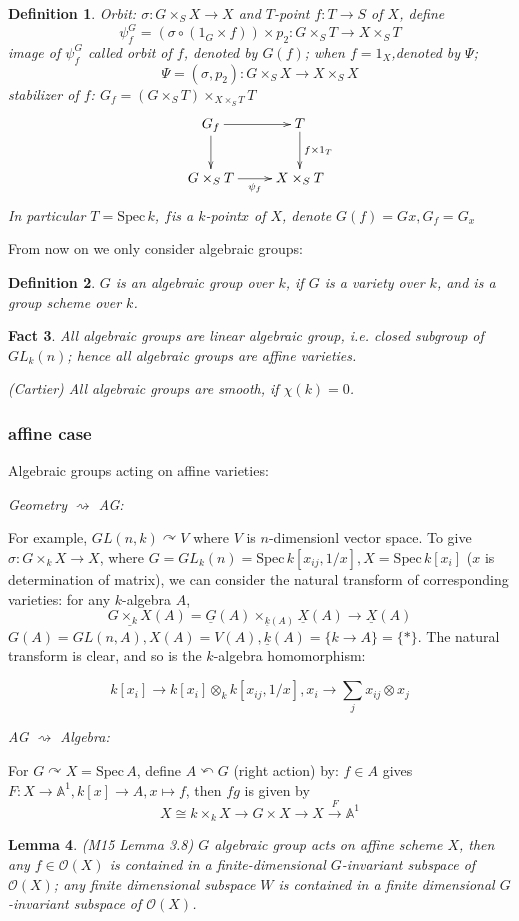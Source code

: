 \documentclass{article}
\newtheorem{defn}{Definition}[section]
\newtheorem{lem}[defn]{Lemma}
\newtheorem{fact}[defn]{Fact}
\newcommand{\Spec}{\mathrm{Spec}\,}
\begin{document}
\begin{defn}
	Orbit: $ \sigma :G\times_S X\to X $ and  $ T $-point $ f:T\to S $ of $ X $, define $$ \psi_f^G=(\sigma\circ (1_G\times f))\times p_2:G\times _S T\to X\times_ST  $$
	image of $ \psi_f^G $ called orbit of $ f $, denoted by $ G(f) $; when $ f=1_X $,denoted by $ \Psi $;
	$$ \Psi=(\sigma,p_2):G\times_SX\to X\times_SX $$	
	stabilizer of $ f $: $ G_f=(G\times_S T)\times_{X\times_S T} T $
	$$\xymatrix{
		G_f \ar[d] \ar[r] & T \ar[d]^-{f\times 1_T} \\
		G\times_S T \ar[r]_-{\psi _f} & X\times_S T
	}$$
	In particular $ T=\mathrm{Spec}\,k $, $ f $is a $ k $-point$ x $ of $ X $, denote $ G(f)=Gx,G_f=G_x $
\end{defn}

From now on we only consider algebraic groups:
\begin{defn}
	$ G $ is an algebraic group over $ k $, if $ G $ is a variety over $ k $, and is a group scheme over $ k $.
\end{defn}

\begin{fact}
	All algebraic groups are linear algebraic group, i.e. closed subgroup of $ GL_k(n) $; hence all algebraic groups are affine varieties.
	
	(Cartier) All algebraic groups are smooth, if $ \chi(k)=0 $.
\end{fact}
\subsubsection{affine case}
Algebraic groups acting on affine varieties:

\emph{Geometry $ \rightsquigarrow $ AG:}

For example, $ GL(n,k)\curvearrowright V $ where $ V $ is $ n $-dimensionl vector space. To give $ \sigma:G\times_kX\to X $, where $ G=GL_k(n)=\Spec k[x_{ij},1/x], X=\Spec k[x_i] $ ($ x $ is determination of matrix), we can consider the natural transform of corresponding varieties: for any $ k $-algebra $ A $,
$$ \underline{G\times_kX}(A)=\underline{G}(A)\times_{\underline{k}(A)}\underline{X}(A)\to \underline{X}(A) $$
  $ G(A)=GL(n,A),X(A)=V(A),\underline{k}(A)=\{k\to A \}=\{* \} $. The  natural transform is clear, and so is the $ k $-algebra homomorphism:
  
  $$ k[x_i]\to k[x_i]\otimes_kk[x_{ij},1/x], x_i\to \sum_{j}x_{ij}\otimes x_j $$

\emph{AG $ \rightsquigarrow $ Algebra:}

 For $ G\curvearrowright X=\Spec A $, define $ A\curvearrowleft G $ (right action) by: $ f\in A $ gives $ F:X\to \mathbb{A}^1, k[x]\to A, x\mapsto f $, then $ fg $ is given by 
$$ X\cong k\times_kX\to G\times X\to X\xrightarrow{F} \mathbb{A}^1 $$
\begin{lem}(M15 Lemma 3.8)
	$ G $ algebraic group acts on affine scheme $ X $, then any $ f\in \mathcal{O}(X) $ is contained in a finite-dimensional $ G $-invariant subspace of $ \mathcal{O}(X) $; any finite dimensional subspace $ W $ is contained in a finite dimensional $ G $-invariant subspace of $ \mathcal{O}(X) $.
\end{lem}
\end{document}
